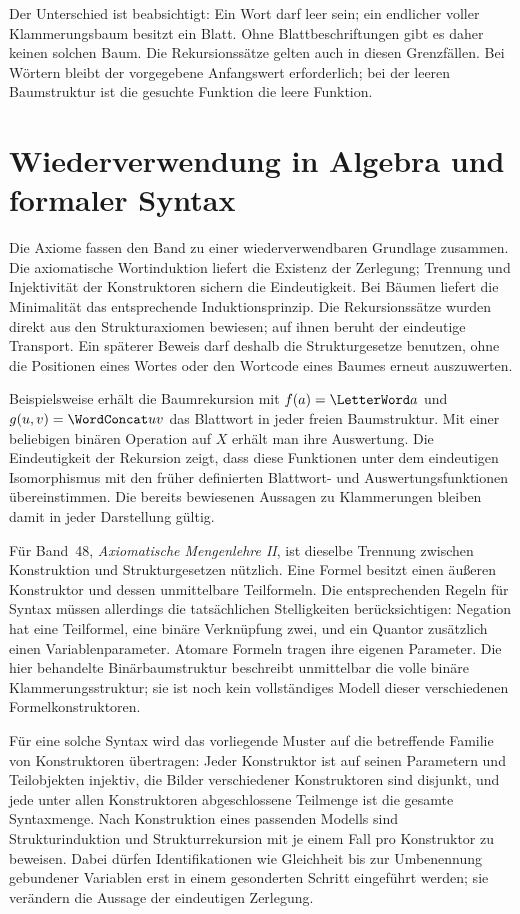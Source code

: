 Der Unterschied ist beabsichtigt: Ein Wort darf leer sein; ein endlicher
voller Klammerungsbaum besitzt ein Blatt. Ohne Blattbeschriftungen gibt es
daher keinen solchen Baum. Die Rekursionssätze gelten auch in diesen
Grenzfällen. Bei Wörtern bleibt der vorgegebene Anfangswert erforderlich;
bei der leeren Baumstruktur ist die gesuchte Funktion die leere Funktion.

\section{Wiederverwendung in Algebra und formaler Syntax}

Die Axiome fassen den Band zu einer wiederverwendbaren Grundlage zusammen.
Die axiomatische Wortinduktion liefert die Existenz der Zerlegung;
Trennung und Injektivität der Konstruktoren sichern die Eindeutigkeit.
Bei Bäumen liefert die Minimalität das entsprechende Induktionsprinzip.
Die Rekursionssätze wurden direkt
aus den Strukturaxiomen bewiesen; auf ihnen beruht der eindeutige Transport. Ein späterer Beweis darf
deshalb die Strukturgesetze benutzen, ohne die Positionen eines Wortes
oder den Wortcode eines Baumes erneut auszuwerten.

Beispielsweise erhält die Baumrekursion mit
\(f(a)=\LetterWord a\) und \(g(u,v)=\WordConcat u v\) das Blattwort in
jeder freien Baumstruktur. Mit einer beliebigen binären Operation auf
\(X\) erhält man ihre Auswertung. Die Eindeutigkeit der Rekursion zeigt,
dass diese Funktionen unter dem eindeutigen Isomorphismus mit den früher
definierten Blattwort- und Auswertungsfunktionen übereinstimmen. Die
bereits bewiesenen Aussagen zu Klammerungen bleiben damit in jeder
Darstellung gültig.

Für Band~48, \emph{Axiomatische Mengenlehre II}, ist dieselbe Trennung
zwischen Konstruktion und Strukturgesetzen nützlich. Eine Formel besitzt
einen äußeren Konstruktor und dessen unmittelbare Teilformeln. Die
entsprechenden Regeln für Syntax müssen allerdings die tatsächlichen
Stelligkeiten berücksichtigen: Negation hat eine Teilformel, eine binäre
Verknüpfung zwei, und ein Quantor zusätzlich einen Variablenparameter.
Atomare Formeln tragen ihre eigenen Parameter. Die hier behandelte
Binärbaumstruktur beschreibt unmittelbar die volle binäre
Klammerungsstruktur; sie ist noch kein vollständiges Modell dieser
verschiedenen Formelkonstruktoren.

Für eine solche Syntax wird das vorliegende Muster auf die betreffende
Familie von Konstruktoren übertragen: Jeder Konstruktor ist auf seinen
Parametern und Teilobjekten injektiv, die Bilder verschiedener
Konstruktoren sind disjunkt, und jede unter allen Konstruktoren
abgeschlossene Teilmenge ist die gesamte Syntaxmenge. Nach Konstruktion
eines passenden Modells sind Strukturinduktion und Strukturrekursion
mit je einem Fall pro Konstruktor zu beweisen. Dabei dürfen Identifikationen
wie Gleichheit bis zur Umbenennung gebundener Variablen erst in einem
gesonderten Schritt eingeführt werden; sie verändern die Aussage der
eindeutigen Zerlegung.


